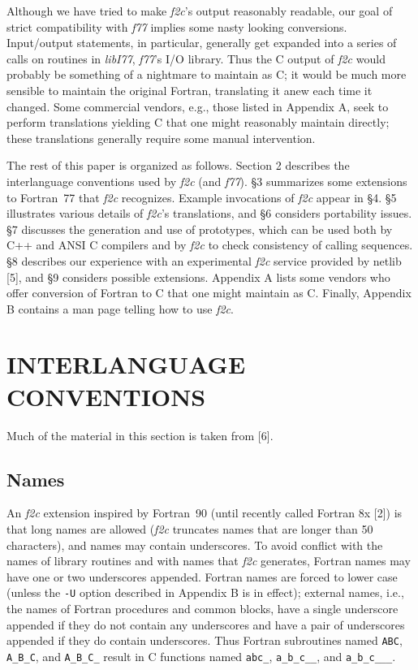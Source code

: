 \documentclass[12pt]{article}
\begin{document}
Although we have tried to make \emph{f2c}’s output reasonably readable, our goal of strict compatibility with \emph{f77} implies some nasty looking conversions. Input/output statements, in particular, generally get expanded into a series of calls on routines in \emph{libI77}, \emph{f77}’s I/O library. Thus the C output of \emph{f2c} would probably be something of a nightmare to maintain as C; it would be much more sensible to maintain the original Fortran, translating it anew each time it changed. Some commercial vendors, e.g., those listed in Appendix A, seek to perform translations yielding C that one might reasonably maintain directly; these translations generally require some manual intervention.

The rest of this paper is organized as follows. Section 2 describes the interlanguage conventions used by \emph{f2c} (and \emph{f77}). §3 summarizes some extensions to Fortran~77 that \emph{f2c} recognizes. Example invocations of \emph{f2c} appear in §4. §5 illustrates various details of \emph{f2c}’s translations, and §6 considers portability issues. §7 discusses the generation and use of prototypes, which can be used both by C++ and ANSI C compilers and by \emph{f2c} to check consistency of calling sequences. §8 describes our experience with an experimental \emph{f2c} service provided by netlib [5], and §9 considers possible extensions. Appendix A lists some vendors who offer conversion of Fortran to C that one might maintain as C. Finally, Appendix B contains a man page telling how to use \emph{f2c}.

\section{INTERLANGUAGE CONVENTIONS}

Much of the material in this section is taken from [6].

\subsection*{Names}

An \emph{f2c} extension inspired by Fortran~90 (until recently called Fortran 8x [2]) is that long names are allowed (\emph{f2c} truncates names that are longer than 50 characters), and names may contain underscores. To avoid conflict with the names of library routines and with names that \emph{f2c} generates, Fortran names may have one or two underscores appended. Fortran names are forced to lower case (unless the \verb|-U| option described in Appendix B is in effect); external names, i.e., the names of Fortran procedures and common blocks, have a single underscore appended if they do not contain any underscores and have a pair of underscores appended if they do contain underscores. Thus Fortran subroutines named \verb|ABC|, \verb|A_B_C|, and \verb|A_B_C_| result in C functions named \verb|abc_|, \verb|a_b_c__|, and \verb|a_b_c___|.
\end{document}
